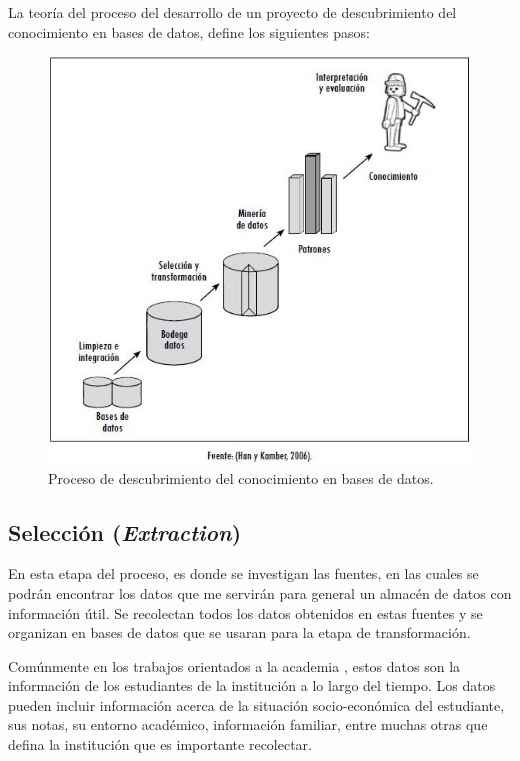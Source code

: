 La teoría del proceso del desarrollo de un proyecto de descubrimiento del conocimiento en bases de datos, define los siguientes pasos:
\begin{figure}[H]
\begin{centering}
\includegraphics[scale=0.5]{v13n1a07-3}
\par\end{centering}
\caption{Proceso de descubrimiento del conocimiento en bases de datos.}
\end{figure}
\subsection{Selección (\emph{Extraction}) \cite{key-50,key-100}}
En esta etapa del proceso, es donde se investigan las fuentes, en las cuales se podrán encontrar los datos que me servirán para general un almacén de datos con información útil. Se recolectan todos los datos obtenidos en estas fuentes y se organizan en bases de datos que se usaran para la etapa de transformación.

Comúnmente en los trabajos orientados a la academia \cite{key-100, key-110, key-130, key-140}, estos datos son la información de los estudiantes de la institución a lo largo del tiempo. Los datos pueden incluir información acerca de la situación socio-económica del estudiante, sus notas, su entorno académico, información familiar, entre muchas otras que defina la institución que es importante recolectar.

